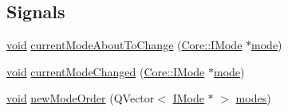 \subsection*{\-Signals}
\begin{DoxyCompactItemize}
\item 
\hyperlink{group___u_a_v_objects_plugin_ga444cf2ff3f0ecbe028adce838d373f5c}{void} \hyperlink{group___core_plugin_gaa77e7371f833a065f7608953552acb2e}{current\-Mode\-About\-To\-Change} (\hyperlink{class_core_1_1_i_mode}{\-Core\-::\-I\-Mode} $\ast$\hyperlink{group___core_plugin_ga2f29188b707a73ac13c2312497b99219}{mode})
\item 
\hyperlink{group___u_a_v_objects_plugin_ga444cf2ff3f0ecbe028adce838d373f5c}{void} \hyperlink{group___core_plugin_gae6bfcb951bb5f94b642a368c82116faf}{current\-Mode\-Changed} (\hyperlink{class_core_1_1_i_mode}{\-Core\-::\-I\-Mode} $\ast$\hyperlink{group___core_plugin_ga2f29188b707a73ac13c2312497b99219}{mode})
\item 
\hyperlink{group___u_a_v_objects_plugin_ga444cf2ff3f0ecbe028adce838d373f5c}{void} \hyperlink{group___core_plugin_ga43ebcb6f603d4f852c917bc5ed76c124}{new\-Mode\-Order} (\-Q\-Vector$<$ \hyperlink{class_core_1_1_i_mode}{\-I\-Mode} $\ast$ $>$ \hyperlink{group___core_plugin_gafe066d728cdaeffc19eb6407a41e29e0}{modes})
\end{DoxyCompactItemize}
